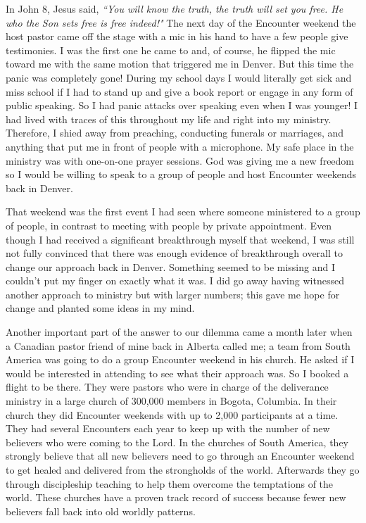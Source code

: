 \documentclass[oneside]{book}
\begin{document}
In John 8, Jesus said, \textit{``You will know the truth, the truth will set you free. He who the Son sets free is free indeed!"} The next day of the Encounter weekend the host pastor came off the stage with a mic in his hand to have a few people give testimonies. I was the first one he came to and, of course, he flipped the mic toward me with the same motion that triggered me in Denver. But this time the panic was completely gone! During my school days I would literally get sick and miss school if I had to stand up and give a book report or engage in any form of public speaking. So I had panic attacks over speaking even when I was younger! I had lived with traces of this throughout my life and right into my ministry. Therefore, I shied away from preaching, conducting funerals or marriages, and anything that put me in front of people with a microphone. My safe place in the ministry was with one-on-one prayer sessions. God was giving me a new freedom so I would be willing to speak to a group of people and host Encounter weekends back in Denver. 


That weekend was the first event I had seen where someone ministered to a group of people, in contrast to meeting with people by private appointment. Even though I had received a significant breakthrough myself that weekend, I was still not fully convinced that there was enough evidence of breakthrough overall to change our approach back in Denver. Something seemed to be missing and I couldn't put my finger on exactly what it was. I did go away having witnessed another approach to ministry but with larger numbers; this gave me hope for change and planted some ideas in my mind.

Another important part of the answer to our dilemma came a month later when a Canadian pastor friend of mine back in Alberta called me; a team from South America was going to do a group Encounter weekend in his church. He asked if I would be interested in attending to see what their approach was. So I booked a flight to be there. They were pastors who were in charge of the deliverance ministry in a large church of 300,000 members in Bogota, Columbia. In their church they did Encounter weekends with up to 2,000 participants at a time. They had several Encounters each year to keep up with the number of new believers who were coming to the Lord. In the churches of South America, they strongly believe that all new believers need to go through an Encounter weekend to get healed and delivered from the strongholds of the world. Afterwards they go through discipleship teaching to help them overcome the temptations of the world. These churches have a proven track record of success because fewer new believers fall back into old worldly patterns. 
\end{document}
